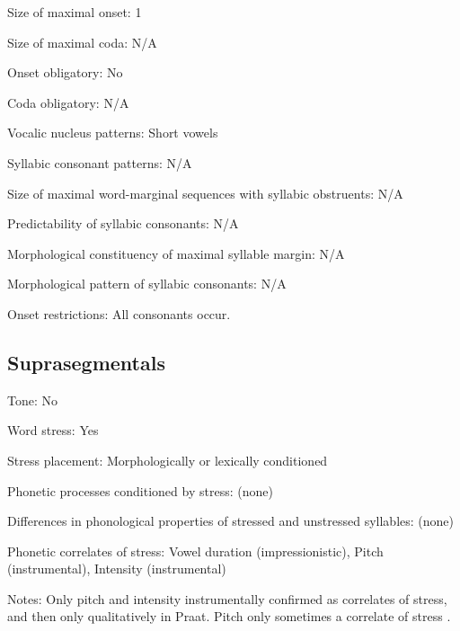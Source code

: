 {\begin{appendixdesc}
\item[Size of maximal onset:] 1

\item[Size of maximal coda:] N/A

\item[Onset obligatory:] No

\item[Coda obligatory:] N/A

\item[Vocalic nucleus patterns:] Short vowels

\item[Syllabic consonant patterns:] N/A

\item[Size of maximal word-marginal sequences with syllabic obstruents:] N/A

\item[Predictability of syllabic consonants:] N/A

\item[Morphological constituency of maximal syllable margin:] N/A

\item[Morphological pattern of syllabic consonants:] N/A

\item[Onset restrictions:] All consonants occur.
\end{appendixdesc}
\subsection*{Suprasegmentals}
\begin{appendixdesc}
\item[Tone:] No

\item[Word stress:] Yes

\item[Stress placement:] Morphologically or lexically conditioned

\item[Phonetic processes conditioned by stress:] (none)

\item[Differences in phonological properties of stressed and unstressed syllables:] (none)

\item[Phonetic correlates of stress:] Vowel duration (impressionistic), Pitch (instrumental), Intensity (instrumental)

\item[Notes:] Only pitch and intensity instrumentally confirmed as correlates of stress, and then only qualitatively in Praat. Pitch only sometimes a correlate of stress \citet[24]{Wegener2008}.
\end{appendixdesc}
}
